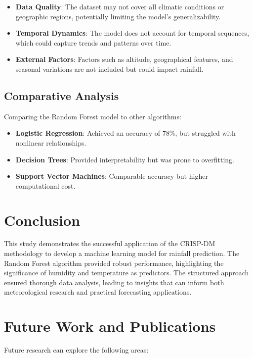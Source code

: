 \documentclass[12pt]{article}
\begin{document}
\begin{itemize}
    \item \textbf{Data Quality}: The dataset may not cover all climatic conditions or geographic regions, potentially limiting the model's generalizability.
    \item \textbf{Temporal Dynamics}: The model does not account for temporal sequences, which could capture trends and patterns over time.
    \item \textbf{External Factors}: Factors such as altitude, geographical features, and seasonal variations are not included but could impact rainfall.
\end{itemize}

\subsection{Comparative Analysis}
Comparing the Random Forest model to other algorithms:

\begin{itemize}
    \item \textbf{Logistic Regression}: Achieved an accuracy of 78\%, but struggled with nonlinear relationships.
    \item \textbf{Decision Trees}: Provided interpretability but was prone to overfitting.
    \item \textbf{Support Vector Machines}: Comparable accuracy but higher computational cost.
\end{itemize}

\section{Conclusion}
This study demonstrates the successful application of the CRISP-DM methodology to develop a machine learning model for rainfall prediction. The Random Forest algorithm provided robust performance, highlighting the significance of humidity and temperature as predictors. The structured approach ensured thorough data analysis, leading to insights that can inform both meteorological research and practical forecasting applications.

\section{Future Work and Publications}
Future research can explore the following areas:
\end{document}

